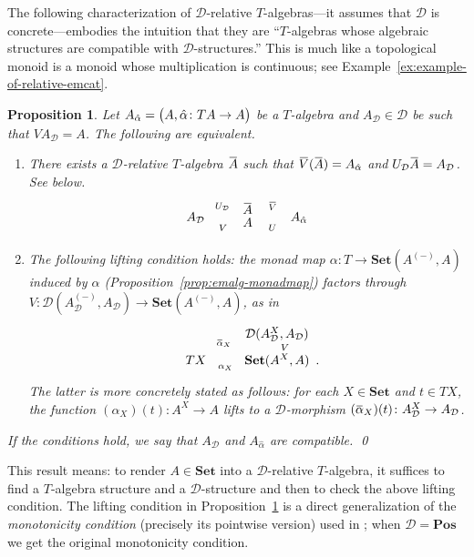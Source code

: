 \documentclass[9pt, preprint]{sigplanconf}
\theoremstyle{theorem}
\newtheorem{proposition}[theorem]{Proposition}
\theoremstyle{definition}
\newcommand{\cat}[1]{\mathcal{#1}}
\renewcommand{\bar}{\overbar}
\newcommand{\overbar}[1]{\mkern 1.5mu\overline{\mkern-1.5mu#1\mkern-1.5mu}\mkern 1.5mu}
\newcommand{\place}{{-}}
\newcommand{\Set}{\mathbf{Set}}
\newcommand{\Sets}{\Set}
\newcommand{\Pos}{\mathbf{Pos}}
\DeclarePairedDelimiter\p{(}{)}
\begin{document}
The following characterization of $\cat{D}$-relative $T$-algebras---it
assumes that  $\cat{D}$ is concrete---embodies the intuition that they
are ``$T$-algebras whose algebraic structures are compatible with
$\cat{D}$-structures.'' This is much like a topological monoid is a
monoid whose multiplication is continuous; see
Example~\ref{ex:example-of-relative-emcat}.
\begin{proposition}
  \label{prop:lifting-condition}
  Let $A_{\hat{\alpha}} = \p[\big]{A, \hat{\alpha} \colon TA \to A}$
  be a $T$-algebra and
  $A_{\cat{D}}\in\cat{D}$ be such that $V A_{\cat{D}} = A$.
  The following are equivalent.
  \begin{enumerate}
   \item  There exists
  a $\cat{D}$-relative $T$-algebra $\bar{A}$
  such that $\bar{V} (\bar{A}) = A_{\hat{\alpha}}$
  and $U_{\cat{D}} \bar{A} = A_\cat{D}$. See below.
   \begin{equation}\label{eq:compatibility-D-EMT}
  \vcenter{  \xymatrix@R-3.3em{
      & \bar{A} \ar@{|-->}[ld]_-{U_{\cat{D}}} \ar@{|-->}[rd]^-{\bar{V}} \\
      A_{\cat{D}} \ar@{|->}[rd]_-{V}
      && A_{\hat{\alpha}} \ar@{|->}[ld]^-{U} \\
      & A
    }
  }\end{equation}
   \item  The following
  \emph{lifting condition} holds:
  the monad map $\alpha \colon T \to \Set(A^{(\place)}, A)$
  induced by $\hat{\alpha}$ (Proposition~\ref{prop:emalg-monadmap})
	  factors through
  $V \colon \cat{D}(A_{\cat{D}}^{(\place)}, A_{\cat{D}}) \to
	  \Set(A^{(\place)}, A)$, as in
  \begin{equation}\label{eq:lifting-condition}
\vcenter{    \xymatrix@R-2em{
      & \cat{D}(A_{\cat{D}}^{X}, A_{\cat{D}}) \ar[d]^-{V} \\
      TX \ar[r]_-{\alpha_X} \ar@{-->}[ur]^-{\bar{\alpha}_X}
      & \Set(A^{X}, A)\mathrlap{\enspace.}
    }
}  \end{equation}
   The latter is more concretely stated as follows:
    for each  $X \in \Set$ and $t \in TX$,
     the function $(\alpha_X)(t) \colon A^X \to A$
  lifts to a $\cat{D}$-morphism
  $(\bar{\alpha}_X)(t) \colon A_{\cat{D}}^X \to A_{\cat{D}}$.
  \end{enumerate}
If the conditions hold, we say that
  $A_{\cat{D}}$ and $A_{\hat{\alpha}}$ are \emph{compatible}.
\qed
\end{proposition}
This result means: to render $A\in\Sets$ into
 a $\cat{D}$-relative $T$-algebra, it suffices to find a $T$-algebra
 structure and a
$\cat{D}$-structure and then to check the above lifting condition.
The lifting condition in Proposition~\ref{prop:lifting-condition}
is a direct generalization of the \emph{monotonicity condition}
(precisely its pointwise version) used in \cite{Hasuo14, Hasuo15TCS};
when $\cat{D} = \Pos$ we get the original monotonicity condition.
\end{document}
